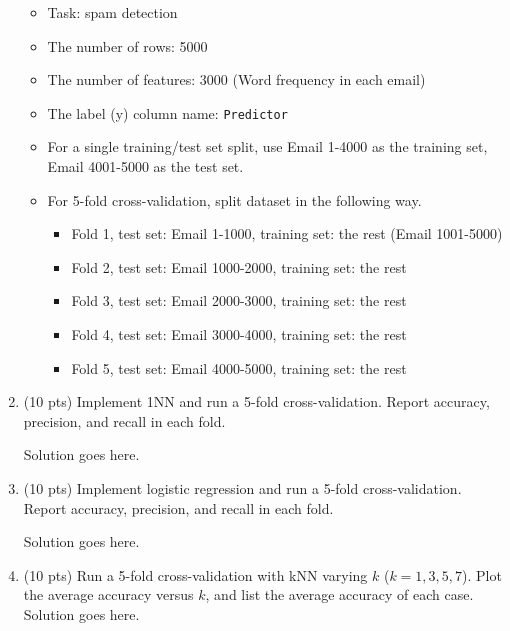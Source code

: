 \documentclass[a4paper]{article}
\theoremstyle{definition}
\newenvironment{soln}{
    \leavevmode\color{blue}\ignorespaces
}{}
\begin{document}
\begin{enumerate}
	\begin{itemize}
		\item Task: spam detection
		\item The number of rows: 5000
		\item The number of features: 3000 (Word frequency in each email)
		\item The label (y) column name: {\tt Predictor}
		\item For a single training/test set split, use Email 1-4000 as the training set, Email 4001-5000 as the test set.
		\item For 5-fold cross-validation, split dataset in the following way.
		\begin{itemize}
			\item Fold 1, test set: Email 1-1000, training set: the rest (Email 1001-5000)
			\item Fold 2, test set: Email 1000-2000, training set: the rest
			\item Fold 3, test set: Email 2000-3000, training set: the rest
			\item Fold 4, test set: Email 3000-4000, training set: the rest
			\item Fold 5, test set: Email 4000-5000, training set: the rest			
		\end{itemize}
	\end{itemize}
	
	\item (10 pts) Implement 1NN and run a 5-fold cross-validation. Report accuracy, precision, and recall in each fold.
	
	\begin{soln}  Solution goes here. \end{soln}
	
	\item (10 pts) Implement logistic regression and run a 5-fold cross-validation. Report accuracy, precision, and recall in each fold.
	
	\begin{soln}  Solution goes here. \end{soln}
	
	\item (10 pts) Run a 5-fold cross-validation with kNN varying $k$ ($k=1, 3, 5, 7$). Plot the average accuracy versus $k$, and list the average accuracy of each case.
	\begin{soln}  Solution goes here. \end{soln}
	

\end{enumerate}
\end{document}
